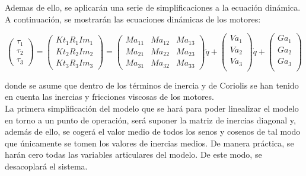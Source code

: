 Ademas de ello, se aplicarán una serie de simplificaciones a la ecuación dinámica. A continuación, se mostrarán las ecuaciones dinámicas de los motores:\\

\begin{center}
	$$
	\begin{pmatrix}

		\tau_{1} \\

		\tau_{2} \\

		\tau_ {3}
	\end{pmatrix}=
	\begin{pmatrix}
		Kt_{1}R_{1}Im_{1}  \\

		Kt_{2}R_{2}Im_{2}  \\

		Kt_{3}R_{3}Im_{3}
	\end{pmatrix} =
	\begin{pmatrix}
		Ma_{11} & Ma_{12} & Ma_{13}  \\

		Ma_{21} & Ma_{22} & Ma_{23}  \\

		Ma_{31} & Ma_{32} & Ma_{33}
	\end{pmatrix}
	\ddot{q}+
	\begin{pmatrix}
		Va_{1} \\

		Va_{2} \\

		Va_{3} \\
	\end{pmatrix}
	\dot{q}+
	\begin{pmatrix}
		Ga_{1}  \\

		Ga_{2}  \\

		Ga_{3}\\
	\end{pmatrix}
	$$
\end{center}

donde se asume que dentro de los términos de inercia y de Coriolis se han tenido en cuenta las inercias y fricciones viscosas de los motores.\\



La primera simplificación del modelo que se hará para poder linealizar el modelo en torno a un punto de operación, será suponer la matriz de inercias diagonal y, además de ello, se cogerá el valor medio de todos los senos y cosenos de tal modo que únicamente se tomen los valores de inercias medios. De manera práctica, se harán cero todas las variables articulares del modelo. De este modo, se desacoplará el sistema.\\

